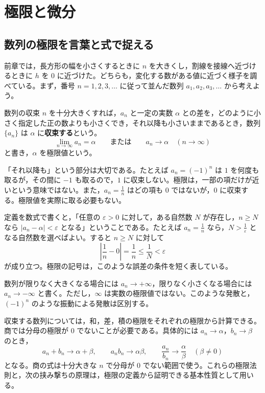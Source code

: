 \chapter{極限と微分}\label{章:極限と微分}
\section{数列の極限を言葉と式で捉える}\label{節:数列極限}
前章では，長方形の幅を小さくするときに $n$ を大きくし，割線を接線へ近づけるときに $h$ を $0$ に近づけた。どちらも，変化する数がある値に近づく様子を調べている。まず，番号 $n=1,2,3,\ldots$ に従って並んだ数列 $a_1,a_2,a_3,\ldots$ から考えよう。

\begin{definition}{数列の収束}
$n$ を十分大きくすれば，$a_n$ と一定の実数 $\alpha$ との差を，どのように小さく指定した正の数よりも小さくでき，それ以降も小さいままであるとき，数列 $\{a_n\}$ は $\alpha$ に\textbf{収束する}という。
\[
 \lim_{n\to\infty}a_n=\alpha
 \qquad\text{または}\qquad a_n\to\alpha\quad(n\to\infty)
\]
と書き，$\alpha$ を極限値という。
\end{definition}

「それ以降も」という部分は大切である。たとえば $a_n=(-1)^n$ は $1$ を何度も取るが，その間に $-1$ も取るので，$1$ に収束しない。極限は，一部の項だけが近いという意味ではない。また，$a_n=\frac1n$ はどの項も $0$ ではないが，$0$ に収束する。極限値を実際に取る必要もない。

定義を数式で書くと，「任意の $\varepsilon>0$ に対して，ある自然数 $N$ が存在し，$n\ge N$ なら $|a_n-\alpha|<\varepsilon$ となる」ということである。たとえば $a_n=\frac1n$ なら，$N>\frac1\varepsilon$ となる自然数を選べばよい。すると $n\ge N$ に対して
\[
 \left|\frac1n-0\right|=\frac1n\le\frac1N<\varepsilon
\]
が成り立つ。極限の記号は，このような誤差の条件を短く表している。

数列が限りなく大きくなる場合には $a_n\to+\infty$，限りなく小さくなる場合には $a_n\to-\infty$ と書く。ただし，$\infty$ は実数の極限値ではない。このような発散と，$(-1)^n$ のような振動による発散は区別する。

収束する数列については，和，差，積の極限をそれぞれの極限から計算できる。商では分母の極限が $0$ でないことが必要である。具体的には $a_n\to\alpha$，$b_n\to\beta$ のとき，
\[
 a_n+b_n\to\alpha+\beta,\qquad
 a_nb_n\to\alpha\beta,\qquad
 \frac{a_n}{b_n}\to\frac\alpha\beta\quad(\beta\ne0)
\]
となる。商の式は十分大きな $n$ で分母が $0$ でない範囲で使う。これらの極限法則と，次の挟み撃ちの原理は，極限の定義から証明できる基本性質として用いる。

